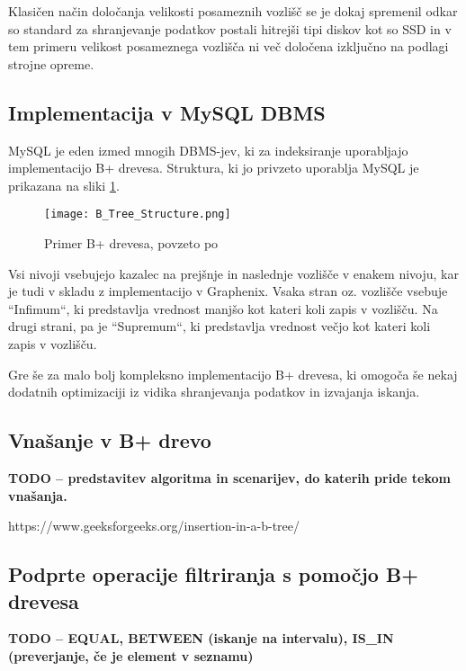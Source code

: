 \documentclass[a4paper,12pt,openright]{book}
\begin{document}
        Klasičen način določanja velikosti posameznih vozlišč se je dokaj spremenil odkar so standard za shranjevanje podatkov postali hitrejši tipi diskov kot so SSD in v tem primeru velikost posameznega vozlišča ni več določena izključno na podlagi strojne opreme.

        \subsection{Implementacija v MySQL DBMS}

        MySQL je eden izmed mnogih DBMS-jev, ki za indeksiranje uporabljajo implementacijo B+ drevesa. Struktura, ki jo privzeto uporablja MySQL je prikazana na sliki \ref{btree_innodb}.

        \begin{figure}[H]
            \centerline{\texttt{[image: B\_Tree\_Structure.png]}}
            \caption{Primer B+ drevesa, povzeto po \cite{BPTREE_INNODB}}
            \label{btree_innodb}
        \end{figure}

        Vsi nivoji vsebujejo kazalec na prejšnje in naslednje vozlišče v enakem nivoju, kar je tudi v skladu z implementacijo v Graphenix. Vsaka stran oz. vozlišče vsebuje ``Infimum``, ki predstavlja vrednost manjšo kot kateri koli zapis v vozlišču. Na drugi strani, pa je ``Supremum``, ki predstavlja vrednost večjo kot kateri koli zapis v vozlišču.

        Gre še za malo bolj kompleksno implementacijo B+ drevesa, ki omogoča še nekaj dodatnih optimizaciji iz vidika shranjevanja podatkov in izvajanja iskanja.

        \subsection{Vnašanje v B+ drevo}

        \textbf{TODO – predstavitev algoritma in scenarijev, do katerih pride tekom vnašanja.}

        https://www.geeksforgeeks.org/insertion-in-a-b-tree/

        \subsection{Podprte operacije filtriranja s pomočjo B+ drevesa}
        
        \textbf{TODO – EQUAL, BETWEEN (iskanje na intervalu), IS\_IN (preverjanje, če je element v seznamu)}
        
\end{document}
